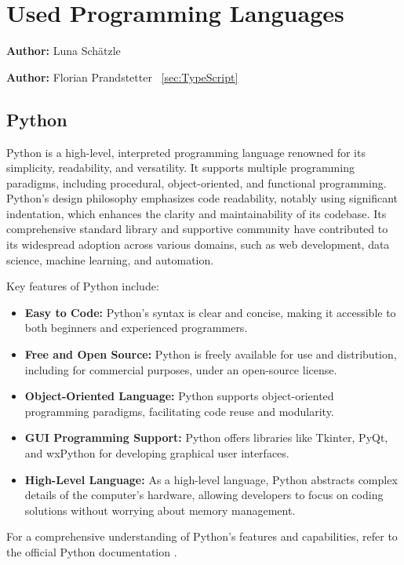 
\chapter{Used Programming Languages}
\label{chap:used_programming_languages}
\textbf{Author:} Luna Schätzle

\textbf{Author:} Florian Prandstetter ~\ref{sec:TypeScript}


\section{Python}

Python is a high-level, interpreted programming language renowned for its simplicity, readability, and versatility. It supports multiple programming paradigms, including procedural, object-oriented, and functional programming. Python's design philosophy emphasizes code readability, notably using significant indentation, which enhances the clarity and maintainability of its codebase. Its comprehensive standard library and supportive community have contributed to its widespread adoption across various domains, such as web development, data science, machine learning, and automation.

Key features of Python include:

\begin{itemize}
    \item \textbf{Easy to Code:} Python's syntax is clear and concise, making it accessible to both beginners and experienced programmers.
    \item \textbf{Free and Open Source:} Python is freely available for use and distribution, including for commercial purposes, under an open-source license.
    \item \textbf{Object-Oriented Language:} Python supports object-oriented programming paradigms, facilitating code reuse and modularity.
    \item \textbf{GUI Programming Support:} Python offers libraries like Tkinter, PyQt, and wxPython for developing graphical user interfaces.
    \item \textbf{High-Level Language:} As a high-level language, Python abstracts complex details of the computer's hardware, allowing developers to focus on coding solutions without worrying about memory management.
\end{itemize}

For a comprehensive understanding of Python's features and capabilities, refer to the official Python documentation \cite{pythonDocumentation}.

